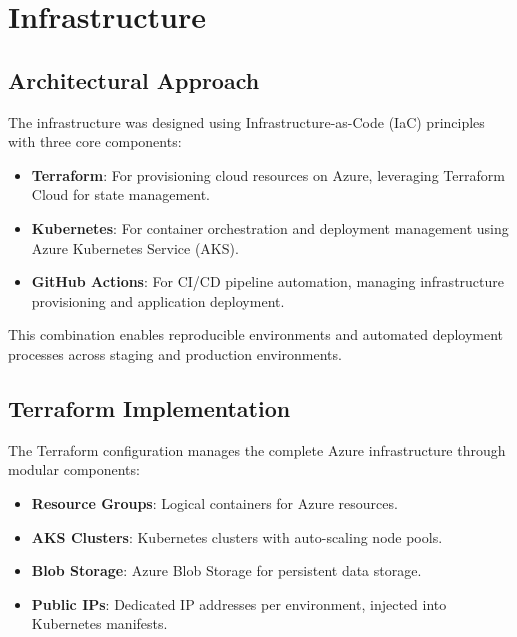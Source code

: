 

\section{Infrastructure}
\label{sec:infrastructure}

\subsection{Architectural Approach}
The infrastructure was designed using Infrastructure-as-Code (IaC) principles with three core components:

\begin{itemize}
    \item \textbf{Terraform}: For provisioning cloud resources on Azure, leveraging Terraform Cloud for state management.
    \item \textbf{Kubernetes}: For container orchestration and deployment management using Azure Kubernetes Service (AKS).
    \item \textbf{GitHub Actions}: For CI/CD pipeline automation, managing infrastructure provisioning and application deployment.
\end{itemize}

This combination enables reproducible environments and automated deployment processes across staging and production environments.

\subsection{Terraform Implementation}
The Terraform configuration manages the complete Azure infrastructure through modular components:

\begin{itemize}
    \item \textbf{Resource Groups}: Logical containers for Azure resources.
    \item \textbf{AKS Clusters}: Kubernetes clusters with auto-scaling node pools.
    \item \textbf{Blob Storage}: Azure Blob Storage for persistent data storage.
    \item \textbf{Public IPs}: Dedicated IP addresses per environment, injected into Kubernetes manifests.
\end{itemize}

